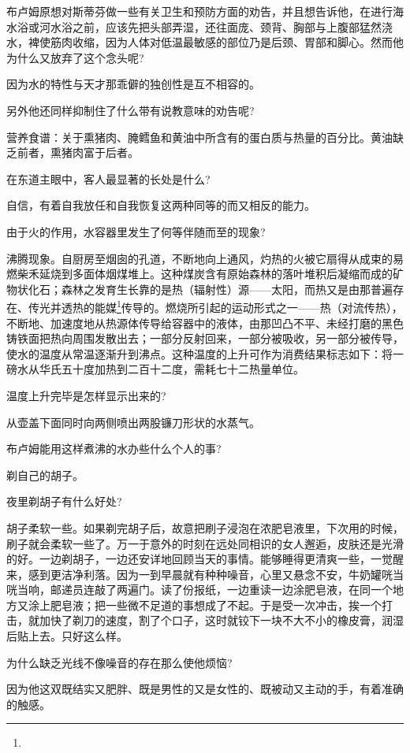 \par 布卢姆原想对斯蒂芬做一些有关卫生和预防方面的劝告，并且想告诉他，在进行海水浴或河水浴之前，应该先把头部弄湿，还往面庞、颈背、胸部与上腹部猛然浇水，裨使筋肉收缩，因为人体对低温最敏感的部位乃是后颈、胃部和脚心。然而他为什么又放弃了这个念头呢?
\par 因为水的特性与天才那乖僻的独创性是互不相容的。
\par 另外他还同样抑制住了什么带有说教意味的劝告呢?
\par 营养食谱：关于熏猪肉、腌鳕鱼和黄油中所含有的蛋白质与热量的百分比。黄油缺乏前者，熏猪肉富于后者。
\par 在东道主眼中，客人最显著的长处是什么?
\par 自信，有着自我放任和自我恢复这两种同等的而又相反的能力。
\par 由于火的作用，水容器里发生了何等伴随而至的现象?
\par 沸腾现象。自厨房至烟囱的孔道，不断地向上通风，灼热的火被它扇得从成束的易燃柴禾延烧到多面体烟煤堆上。这种煤炭含有原始森林的落叶堆积后凝缩而成的矿物状化石；森林之发育生长靠的是热（辐射性）源——太阳，而热又是由那普遍存在、传光并透热的能媒\footnote{}传导的。燃烧所引起的运动形式之一——热（对流传热），不断地、加速度地从热源体传导给容器中的液体，由那凹凸不平、未经打磨的黑色铸铁面把热向周围发散出去；一部分反射回来，一部分被吸收，另一部分被传导，使水的温度从常温逐渐升到沸点。这种温度的上升可作为消费结果标志如下：将一磅水从华氏五十度加热到二百十二度，需耗七十二热量单位。
\par 温度上升完毕是怎样显示出来的?
\par 从壶盖下面同时向两侧喷出两股镰刀形状的水蒸气。
\par 布卢姆能用这样煮沸的水办些什么个人的事?
\par 剃自己的胡子。
\par 夜里剃胡子有什么好处?
\par 胡子柔软一些。如果剃完胡子后，故意把刷子浸泡在浓肥皂液里，下次用的时候，刷子就会柔软一些了。万一于意外的时刻在远处同相识的女人邂逅，皮肤还是光滑的好。一边剃胡子，一边还安详地回顾当天的事情。能够睡得更清爽一些，一觉醒来，感到更洁净利落。因为一到早晨就有种种噪音，心里又悬念不安，牛奶罐咣当咣当响，邮递员连敲了两遍门。读了份报纸，一边重读一边涂肥皂液，在同一个地方又涂上肥皂液；把一些微不足道的事想成了不起。于是受一次冲击，挨一个打击，就加快了剃刀的速度，割了个口子，这时就铰下一块不大不小的橡皮膏，润湿后贴上去。只好这么样。
\par 为什么缺乏光线不像噪音的存在那么使他烦恼?
\par 因为他这双既结实又肥胖、既是男性的又是女性的、既被动又主动的手，有着准确的触感。
